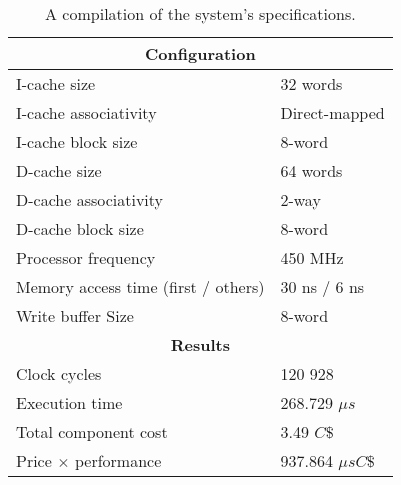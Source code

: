 \documentclass[a4paper,9pt,fleqn]{article}
\begin{document}
\begin{table}
	\center
	\large
	\def\arraystretch{1.2} 
	\begin{tabular}{|l|l|}
		\hline
		\multicolumn{2}{|c|}{\bf Configuration} 						\\ \hline
		I-cache size						& 32 words 			\\ 
		I-cache associativity 				& Direct-mapped		\\ 
		I-cache block size		 			& 8-word				\\ \hline
		D-cache size 		 				& 64 words			\\ 
		D-cache associativity 				& 2-way				\\ 
		D-cache block size 		 			& 8-word				\\ \hline
		Processor frequency		 			& 450 MHz			\\ \hline
		Memory access time (first / others) 		& 30 ns / 6 ns			\\ 
		Write buffer Size 		 			& 8-word				\\ \hline
		\multicolumn{2}{|c|}{\bf Results} 							\\ \hline
		Clock cycles 						& 120 928 			\\ 
		Execution time		 				& 268.729 $ \mu s $ 		\\ 
		Total component cost 				& 3.49 $ C\$ $			\\ 
		Price $ \times $ performance			& 937.864 $ \mu sC\$ $	\\ \hline
	\end{tabular}
	\caption{A compilation of the system's specifications.}
	\label{specs}
\end{table}
\end{document}

